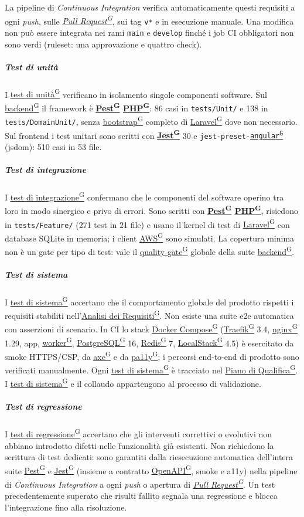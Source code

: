 \documentclass[a4paper,12pt]{article}
\providecommand{\glslink}[2]{\href{https://alittlebyte-19.github.io/Documentazione/glossario.html\#gls-#1}{\underline{#2}\textsuperscript{\scriptsize G}}}
\begin{document}
La pipeline di \textit{Continuous Integration} verifica automaticamente questi requisiti a ogni \textit{push}, sulle \textit{\glslink{pull-request}{Pull Request}}, sui tag \texttt{v*} e in esecuzione manuale. Una modifica non può essere integrata nei rami \texttt{main} e \texttt{develop} finché i job CI obbligatori non sono verdi (ruleset: una approvazione e quattro check).

\subparagraph{Test di unità}
I \glslink{test-di-unita}{test di unità} verificano in isolamento singole componenti software. Sul \glslink{backend}{backend} il framework è \textbf{\glslink{pest}{Pest} \glslink{php}{PHP}}: 86 casi in \texttt{tests/Unit/} e 138 in \texttt{tests/DomainUnit/}, senza \glslink{bootstrap}{bootstrap} completo di \glslink{laravel}{Laravel} dove non necessario. Sul frontend i test unitari sono scritti con \textbf{\glslink{jest}{Jest}} 30 e \texttt{jest-preset-\glslink{angular}{angular}} (jsdom): 510 casi in 53 file.

\subparagraph{Test di integrazione}
I \glslink{test-di-integrazione}{test di integrazione} confermano che le componenti del software operino tra loro in modo sinergico e privo di errori. Sono scritti con \textbf{\glslink{pest}{Pest} \glslink{php}{PHP}}, risiedono in \texttt{tests/Feature/} (271 test in 21 file) e usano il kernel di test di \glslink{laravel}{Laravel} con database SQLite in memoria; i client \glslink{aws}{AWS} sono simulati. La copertura minima non è un gate per tipo di test: vale il \glslink{quality-gate}{quality gate} globale della suite \glslink{backend}{backend}.

\subparagraph{Test di sistema}
I \glslink{test-di-sistema}{test di sistema} accertano che il comportamento globale del prodotto rispetti i requisiti stabiliti nell'\glslink{analisi-dei-requisiti-adr}{Analisi dei Requisiti}. Non esiste una suite e2e automatica con asserzioni di scenario. In CI lo stack \glslink{docker-compose}{Docker Compose} (\glslink{traefik}{Traefik} 3.4, \glslink{nginx}{nginx} 1.29, app, \glslink{worker}{worker}, \glslink{postgresql}{PostgreSQL} 16, \glslink{redis}{Redis} 7, \glslink{localstack}{LocalStack} 4.5) è esercitato da smoke HTTPS/CSP, da \glslink{axe}{axe} e da \glslink{pa11y}{pa11y}; i percorsi end-to-end di prodotto sono verificati manualmente. Ogni \glslink{test-di-sistema}{test di sistema} è tracciato nel \glslink{piano-di-qualifica}{Piano di Qualifica}. I \glslink{test-di-sistema}{test di sistema} e il collaudo appartengono al processo di validazione.

\subparagraph{Test di regressione}
I \glslink{test-di-regressione}{test di regressione} accertano che gli interventi correttivi o evolutivi non abbiano introdotto difetti nelle funzionalità già esistenti. Non richiedono la scrittura di test dedicati: sono garantiti dalla riesecuzione automatica dell'intera suite \glslink{pest}{Pest} e \glslink{jest}{Jest} (insieme a contratto \glslink{openapi}{OpenAPI}, smoke e a11y) nella pipeline di \textit{Continuous Integration} a ogni \textit{push} o apertura di \textit{\glslink{pull-request}{Pull Request}}. Un test precedentemente superato che risulti fallito segnala una regressione e blocca l'integrazione fino alla risoluzione.
\end{document}
